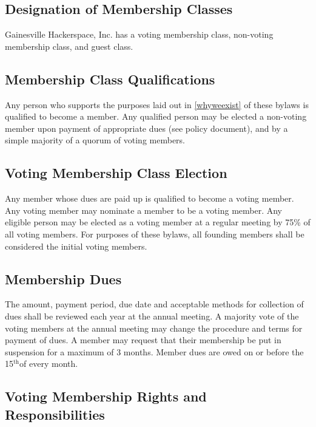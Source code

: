 \documentclass[10pt,letterpaper,titlepage]{article}
\newcommand\corpname{Gainesville Hackerspace, Inc.}
\newcommand{\superscript}[1]{\ensuremath{^{\textrm{#1}}}}
\renewcommand{\th}[0]{\superscript{th}}
\begin{document}
\subsection{Designation of Membership Classes}

\corpname{} has a voting membership class, non-voting membership class, and guest class.

\subsection{Membership Class Qualifications}

Any person who supports the purposes laid out in \ref{whyweexist} of
these bylaws is qualified to become a member.  Any qualified person
may be elected a non-voting member upon payment of appropriate dues
(see policy document), and by a simple majority of a quorum of voting
members.


\subsection{Voting Membership Class Election}

Any member whose dues are paid up is qualified to become a voting
member.  Any voting member may nominate a member to be a voting
member.  Any eligible person may be elected as a voting member at a
regular meeting by 75\% of all voting members.  For purposes of these bylaws,
all founding members shall be considered the initial voting members.


\subsection{Membership Dues}
\label{votmemdue}

The amount, payment period, due date and acceptable methods for collection of
dues shall be reviewed each year at the annual meeting.
A majority vote of the voting members at the annual meeting may change the procedure
and terms for payment of dues.
A member may request that their membership be put in suspension for a maximum
of 3 months.
Member dues are owed on or before the 15\th of every month.

\subsection{Voting Membership Rights and Responsibilities}
\end{document}
